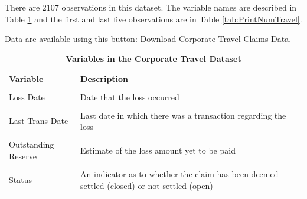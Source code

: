 \documentclass[
  12pt,
  krantz2]{Format/krantzNoCorner}
\begin{document}
There are 2107 observations in this dataset. The variable names are described in Table \ref{tab:DescribeTravel} and the first and last five observations are in Table \ref{tab:PrintNumTravel}.

Data are available using this button:
Download Corporate Travel Claims Data.

\begin{table}[!h]
\centering\centering
\caption{\label{tab:DescribeTravel}\textbf{Variables in the Corporate Travel Dataset}}
\centering
\fontsize{10}{12}\selectfont
\begin{tabular}[t]{>{}l>{\raggedright\arraybackslash}p{12cm}}
\toprule
Variable & Description\\
\midrule
\cellcolor{gray!10}{UW Year} & \cellcolor{gray!10}{Underwriting Year}\\
Loss Date & Date that the loss occurred\\
\cellcolor{gray!10}{Reported Date} & \cellcolor{gray!10}{Date that the loss was reported}\\
Last Trans Date & Last date in which there was a transaction regarding the loss\\
\cellcolor{gray!10}{Paid Loss} & \cellcolor{gray!10}{Cumulative amount paid on the loss}\\
\addlinespace
Outstanding Reserve & Estimate of the loss amount yet to be paid\\
\cellcolor{gray!10}{Incurred Loss} & \cellcolor{gray!10}{Sum of the amount paid and the estimate of future payments}\\
Status & An indicator as to whether the claim has been deemed settled (closed) or not settled (open)\\
\bottomrule
\end{tabular}
\end{table}
\end{document}
